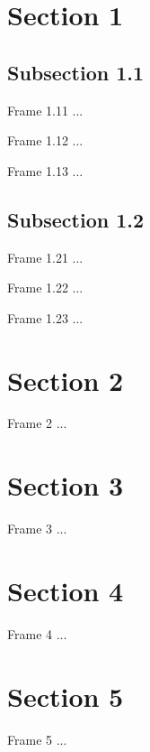\documentclass{beamer}
\begin{document}
\section{Section 1}
\subsection{Subsection 1.1}
\begin{frame}{Frame 1.11}
...
\end{frame}
\begin{frame}{Frame 1.12}
...
\end{frame}
\begin{frame}{Frame 1.13}
...
\end{frame}
\subsection{Subsection 1.2}
\begin{frame}{Frame 1.21}
...
\end{frame}
\begin{frame}{Frame 1.22}
...
\end{frame}
\begin{frame}{Frame 1.23}
...
\end{frame}

\section{Section 2}
\begin{frame}{Frame 2}
...
\end{frame}

\section{Section 3}
\begin{frame}{Frame 3}
...
\end{frame}

\section{Section 4}
\begin{frame}{Frame 4}
...
\end{frame}

\section{Section 5}
\begin{frame}{Frame 5}
...
\end{frame}
\end{document}
